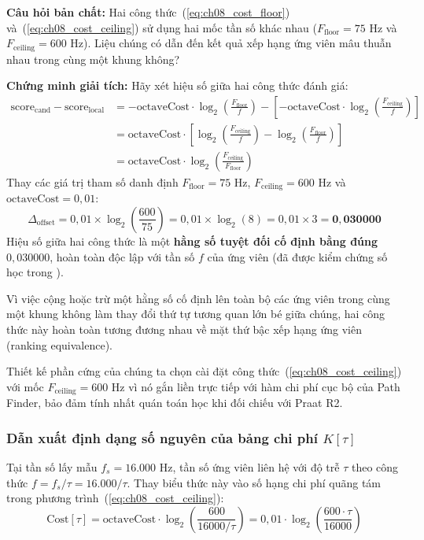 \begin{thoughtqa}
\textbf{Câu hỏi bản chất:} Hai công thức~(\ref{eq:ch08_cost_floor}) và~(\ref{eq:ch08_cost_ceiling}) sử dụng hai mốc tần số khác nhau ($F_{\text{floor}} = 75\text{ Hz}$ và $F_{\text{ceiling}} = 600\text{ Hz}$). Liệu chúng có dẫn đến kết quả xếp hạng ứng viên mâu thuẫn nhau trong cùng một khung không?
\par\noindent\textbf{Chứng minh giải tích:} Hãy xét hiệu số giữa hai công thức đánh giá:
\begin{align}
\text{score}_{\text{cand}} - \text{score}_{\text{local}} &= -\text{octaveCost} \cdot \log_2\left(\frac{F_{\text{floor}}}{f}\right) - \left[ -\text{octaveCost} \cdot \log_2\left(\frac{F_{\text{ceiling}}}{f}\right) \right] \nonumber \\
&= \text{octaveCost} \cdot \left[ \log_2\left(\frac{F_{\text{ceiling}}}{f}\right) - \log_2\left(\frac{F_{\text{floor}}}{f}\right) \right] \nonumber \\
&= \text{octaveCost} \cdot \log_2\left(\frac{F_{\text{ceiling}}}{F_{\text{floor}}}\right)
\label{eq:ch08_cost_diff_proof}
\end{align}
Thay các giá trị tham số danh định $F_{\text{floor}} = 75\text{ Hz}$, $F_{\text{ceiling}} = 600\text{ Hz}$ và $\text{octaveCost} = 0{,}01$:
\begin{equation}
\Delta_{\text{offset}} = 0{,}01 \times \log_2\left(\frac{600}{75}\right) = 0{,}01 \times \log_2(8) = 0{,}01 \times 3 = \mathbf{0{,}030000}
\end{equation}
Hiệu số giữa hai công thức là một \textbf{hằng số tuyệt đối cố định bằng đúng $0{,}030000$}, hoàn toàn độc lập với tần số $f$ của ứng viên (đã được kiểm chứng số học trong ). 

Vì việc cộng hoặc trừ một hằng số cố định lên toàn bộ các ứng viên trong cùng một khung không làm thay đổi thứ tự tương quan lớn bé giữa chúng, hai công thức này hoàn toàn tương đương nhau về mặt thứ bậc xếp hạng ứng viên (ranking equivalence). 

Thiết kế phần cứng của chúng ta chọn cài đặt công thức~(\ref{eq:ch08_cost_ceiling}) với mốc $F_{\text{ceiling}} = 600\text{ Hz}$ vì nó gắn liền trực tiếp với hàm chi phí cục bộ của Path Finder, bảo đảm tính nhất quán toán học khi đối chiếu với Praat R2.
\end{thoughtqa}

\subsubsection*{Dẫn xuất định dạng số nguyên của bảng chi phí $K[\tau]$}
Tại tần số lấy mẫu $f_s = 16.000\text{ Hz}$, tần số ứng viên liên hệ với độ trễ $\tau$ theo công thức $f = f_s / \tau = 16.000 / \tau$. Thay biểu thức này vào số hạng chi phí quãng tám trong phương trình~(\ref{eq:ch08_cost_ceiling}):
\begin{equation}
\text{Cost}[\tau] = \text{octaveCost} \cdot \log_2\left(\frac{600}{16000 / \tau}\right) = 0{,}01 \cdot \log_2\left(\frac{600 \cdot \tau}{16000}\right)
\label{eq:ch08_cost_tau}
\end{equation}

